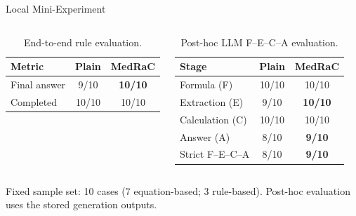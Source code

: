 \begin{frame}{Local Mini-Experiment}
  \raggedright
  \begin{columns}[T,onlytextwidth]
      \begin{table}
        \caption{End-to-end rule evaluation.}
        \label{tab:local-end-to-end}
        \small
        \renewcommand{\arraystretch}{1.12}
        \begin{tabular}{@{}lcc@{}}
          \toprule
          Metric & Plain & MedRaC \\
          \midrule
          Final answer & 9/10 & \textbf{10/10} \\
          Completed & 10/10 & 10/10 \\
          \bottomrule
        \end{tabular}
      \end{table}
      \begin{table}
        \caption{Post-hoc LLM F--E--C--A evaluation.}
        \label{tab:local-stepwise}
        \small
        \renewcommand{\arraystretch}{1.12}
        \begin{tabular}{@{}lcc@{}}
          \toprule
          Stage & Plain & MedRaC \\
          \midrule
          Formula (F) & 10/10 & 10/10 \\
          Extraction (E) & 9/10 & \textbf{10/10} \\
          Calculation (C) & 10/10 & 10/10 \\
          Answer (A) & 8/10 & \textbf{9/10} \\
          Strict F--E--C--A & 8/10 & \textbf{9/10} \\
          \bottomrule
        \end{tabular}
      \end{table}
  \end{columns}
  \vfill
  {\footnotesize\color{Muted}Fixed sample set: 10 cases (7 equation-based; 3 rule-based). Post-hoc evaluation uses the stored generation outputs.}\par
\end{frame}
